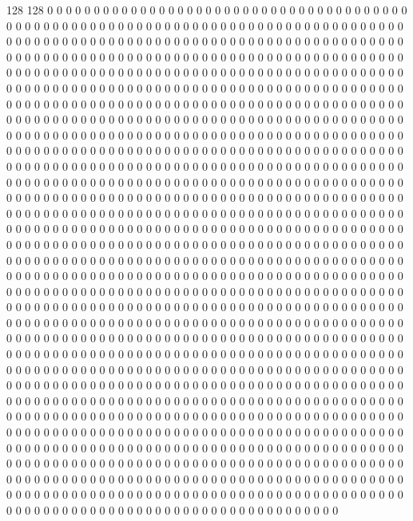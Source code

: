 128 128
0 0 0 0 0 0 0 0 0 0 0 0 0 0 0 0 0 0 0 0 0 0 0 0 0 0 0 0 0 0 0 0 0 0 0 0 0 0 0 0 0 0 0 0 0 0 0 0 0 0 0 0 0 0 0 0 0 0 0 0 0 0 0 0 0 0 0 0 0 0 0 0 0 0 0 0 0 0 0 0 0 0 0 0 0 0 0 0 0 0 0 0 0 0 0 0 0 0 0 0 0 0 0 0 0 0 0 0 0 0 0 0 0 0 0 0 0 0 0 0 0 0 0 0 0 0 0 0
0 0 0 0 0 0 0 0 0 0 0 0 0 0 0 0 0 0 0 0 0 0 0 0 0 0 0 0 0 0 0 0 0 0 0 0 0 0 0 0 0 0 0 0 0 0 0 0 0 0 0 0 0 0 0 0 0 0 0 0 0 0 0 0 0 0 0 0 0 0 0 0 0 0 0 0 0 0 0 0 0 0 0 0 0 0 0 0 0 0 0 0 0 0 0 0 0 0 0 0 0 0 0 0 0 0 0 0 0 0 0 0 0 0 0 0 0 0 0 0 0 0 0 0 0 0 0 0
0 0 0 0 0 0 0 0 0 0 0 0 0 0 0 0 0 0 0 0 0 0 0 0 0 0 0 0 0 0 0 0 0 0 0 0 0 0 0 0 0 0 0 0 0 0 0 0 0 0 0 0 0 0 0 0 0 0 0 0 0 0 0 0 0 0 0 0 0 0 0 0 0 0 0 0 0 0 0 0 0 0 0 0 0 0 0 0 0 0 0 0 0 0 0 0 0 0 0 0 0 0 0 0 0 0 0 0 0 0 0 0 0 0 0 0 0 0 0 0 0 0 0 0 0 0 0 0
0 0 0 0 0 0 0 0 0 0 0 0 0 0 0 0 0 0 0 0 0 0 0 0 0 0 0 0 0 0 0 0 0 0 0 0 0 0 0 0 0 0 0 0 0 0 0 0 0 0 0 0 0 0 0 0 0 0 0 0 0 0 0 0 0 0 0 0 0 0 0 0 0 0 0 0 0 0 0 0 0 0 0 0 0 0 0 0 0 0 0 0 0 0 0 0 0 0 0 0 0 0 0 0 0 0 0 0 0 0 0 0 0 0 0 0 0 0 0 0 0 0 0 0 0 0 0 0
0 0 0 0 0 0 0 0 0 0 0 0 0 0 0 0 0 0 0 0 0 0 0 0 0 0 0 0 0 0 0 0 0 0 0 0 0 0 0 0 0 0 0 0 0 0 0 0 0 0 0 0 0 0 0 0 0 0 0 0 0 0 0 0 0 0 0 0 0 0 0 0 0 0 0 0 0 0 0 0 0 0 0 0 0 0 0 0 0 0 0 0 0 0 0 0 0 0 0 0 0 0 0 0 0 0 0 0 0 0 0 0 0 0 0 0 0 0 0 0 0 0 0 0 0 0 0 0
0 0 0 0 0 0 0 0 0 0 0 0 0 0 0 0 0 0 0 0 0 0 0 0 0 0 0 0 0 0 0 0 0 0 0 0 0 0 0 0 0 0 0 0 0 0 0 0 0 0 0 0 0 0 0 0 0 0 0 0 0 0 0 0 0 0 0 0 0 0 0 0 0 0 0 0 0 0 0 0 0 0 0 0 0 0 0 0 0 0 0 0 0 0 0 0 0 0 0 0 0 0 0 0 0 0 0 0 0 0 0 0 0 0 0 0 0 0 0 0 0 0 0 0 0 0 0 0
0 0 0 0 0 0 0 0 0 0 0 0 0 0 0 0 0 0 0 0 0 0 0 0 0 0 0 0 0 0 0 0 0 0 0 0 0 0 0 0 0 0 0 0 0 0 0 0 0 0 0 0 0 0 0 0 0 0 0 0 0 0 0 0 0 0 0 0 0 0 0 0 0 0 0 0 0 0 0 0 0 0 0 0 0 0 0 0 0 0 0 0 0 0 0 0 0 0 0 0 0 0 0 0 0 0 0 0 0 0 0 0 0 0 0 0 0 0 0 0 0 0 0 0 0 0 0 0
0 0 0 0 0 0 0 0 0 0 0 0 0 0 0 0 0 0 0 0 0 0 0 0 0 0 0 0 0 0 0 0 0 0 0 0 0 0 0 0 0 0 0 0 0 0 0 0 0 0 0 0 0 0 0 0 0 0 0 0 0 0 0 0 0 0 0 0 0 0 0 0 0 0 0 0 0 0 0 0 0 0 0 0 0 0 0 0 0 0 0 0 0 0 0 0 0 0 0 0 0 0 0 0 0 0 0 0 0 0 0 0 0 0 0 0 0 0 0 0 0 0 0 0 0 0 0 0
0 0 0 0 0 0 0 0 0 0 0 0 0 0 0 0 0 0 0 0 0 0 0 0 0 0 0 0 0 0 0 0 0 0 0 0 0 0 0 0 0 0 0 0 0 0 0 0 0 0 0 0 0 0 0 0 0 0 0 0 0 0 0 0 0 0 0 0 0 0 0 0 0 0 0 0 0 0 0 0 0 0 0 0 0 0 0 0 0 0 0 0 0 0 0 0 0 0 0 0 0 0 0 0 0 0 0 0 0 0 0 0 0 0 0 0 0 0 0 0 0 0 0 0 0 0 0 0
0 0 0 0 0 0 0 0 0 0 0 0 0 0 0 0 0 0 0 0 0 0 0 0 0 0 0 0 0 0 0 0 0 0 0 0 0 0 0 0 0 0 0 0 0 0 0 0 0 0 0 0 0 0 0 0 0 0 0 0 0 0 0 0 0 0 0 0 0 0 0 0 0 0 0 0 0 0 0 0 0 0 0 0 0 0 0 0 0 0 0 0 0 0 0 0 0 0 0 0 0 0 0 0 0 0 0 0 0 0 0 0 0 0 0 0 0 0 0 0 0 0 0 0 0 0 0 0
0 0 0 0 0 0 0 0 0 0 0 0 0 0 0 0 0 0 0 0 0 0 0 0 0 0 0 0 0 0 0 0 0 0 0 0 0 0 0 0 0 0 0 0 0 0 0 0 0 0 0 0 0 0 0 0 0 0 0 0 0 0 0 0 0 0 0 0 0 0 0 0 0 0 0 0 0 0 0 0 0 0 0 0 0 0 0 0 0 0 0 0 0 0 0 0 0 0 0 0 0 0 0 0 0 0 0 0 0 0 0 0 0 0 0 0 0 0 0 0 0 0 0 0 0 0 0 0
